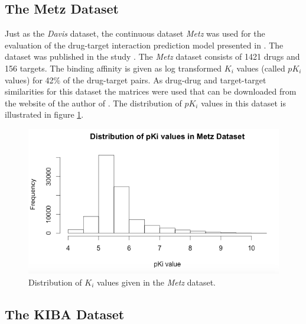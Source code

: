 \subsection{The Metz Dataset}

Just as the \textit{Davis} dataset, the continuous dataset \textit{Metz} was used for the evaluation of the drug-target interaction prediction model presented in \cite{pahikkala2014toward}. The dataset was published in the study \cite{metz2011navigating}. The \textit{Metz} dataset consists of 1421 drugs and 156 targets. The binding affinity is given as log transformed $K_i$ values (called $pK_i$ values) for 42$\%$ of the drug-target pairs. As drug-drug and target-target similarities for this dataset the matrices were used that can be downloaded from the website of the author of \cite{pahikkala2014toward}. The distribution of $pK_i$ values in this dataset is illustrated in figure \ref{fig:metz_dist}.
\begin{figure}
\begin{center}
\includegraphics[scale=0.6]{metz_dist.png}
\end{center}
\caption{Distribution of $K_i$ values given in the \textit{Metz} dataset.}
\label{fig:metz_dist}
\end{figure}

\subsection{The KIBA Dataset}

